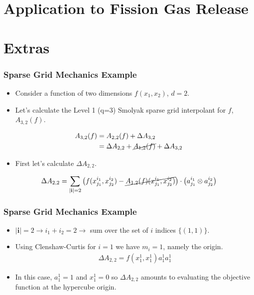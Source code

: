\documentclass{beamer}
\begin{document}
\section{Application to Fission Gas Release}





\section{Extras}

\begin{frame}
\frametitle{Sparse Grid Mechanics Example}

\begin{itemize}
  \item Consider a function of two dimensions $f(x_1, x_2)$, $d=2$. 
  \item Let's calculate the Level 1 (q=3) Smolyak sparse grid interpolant for $f$, $A_{3,2}(f)$.
\end{itemize}

\begin{align*}
A_{3,2}(f) &= A_{2,2}(f) + \Delta A_{3,2} \\
&= \Delta A_{2,2} + \cancel{A_{1,2}(f)} + \Delta A_{3,2} 
\end{align*}

\begin{itemize}
  \item First let's calculate $\Delta A_{2,2}$. 
\end{itemize}

\begin{align*}
    \Delta A_{2,2} = \sum_{\vert\textbf{i}\vert=2}
     \left(f(x_{j_1}^{i_1},x_{j_2}^{i_2}) - 
      \cancel{A_{1,2}(f)(x_{j_1}^{i_1}, x_{j_2}^{i_2})}\right)\cdot
       \left(a_{j_1}^{i_1}\otimes a_{j_2}^{i_2}\right)
\end{align*}

\end{frame}
\begin{frame}
\frametitle{Sparse Grid Mechanics Example}

\begin{itemize}
  \item $\vert\textbf{i}\vert=2 \rightarrow i_1 + i_2 = 2 \rightarrow$ sum over the set of $i$ indices $\lbrace (1, 1)\rbrace$.
  \item Using Clenshaw-Curtis for $i=1$ we have $m_i=1$, namely the origin. 
\begin{align*}
 \Delta A_{2,2} = f\left( x_{1}^{1},x_{1}^{1}\right)a_{1}^{1}a_{1}^{1}
\end{align*}
  \item In this case, $a_1^1 = 1$ and $x_1^1=0$ so $\Delta A_{2,2}$ amounts to evaluating the objective function at the hypercube origin. 
\end{itemize}

\end{frame}
\end{document}
